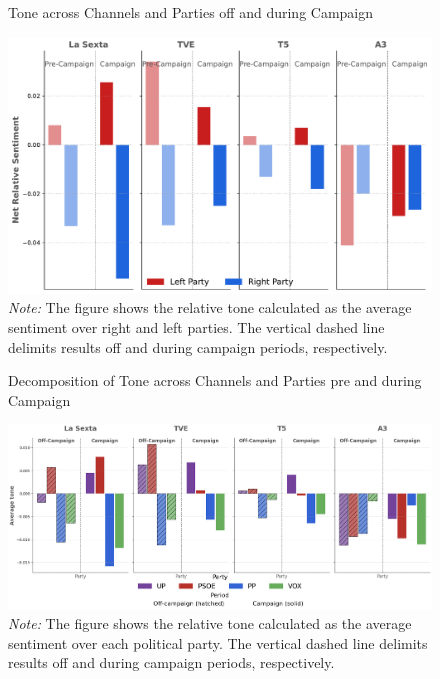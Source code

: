 \documentclass[12pt]{article}
\begin{document}
\begin{figure}[!htb]
	\caption{Tone across Channels and Parties off and during Campaign }
	\centering
	\includegraphics[width=130mm]{figures/average_tone_pre_post_election}
	\caption*{\small \textit{Note:} The figure shows the relative tone calculated as the average sentiment over right and left parties. The vertical dashed line delimits results off and during campaign periods, respectively. }
	\label{fig:tone2}
\end{figure}









\begin{figure}[!htb]
	\caption{Decomposition of Tone across Channels and Parties pre and during Campaign }
	\centering
	\includegraphics[width=150mm]{figures/average_tone_pre_post_election_party.png}
	\caption*{\small \textit{Note:} The figure shows the relative tone calculated as the average sentiment over each political party. The vertical dashed line delimits results off and during campaign periods, respectively. }
	\label{fig:tone_by_party}
\end{figure}
\end{document}
